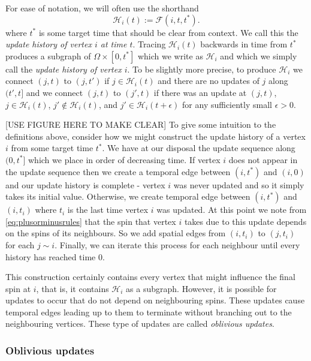 	For ease of notation, we will often use the shorthand
	\begin{equation}
		\mathcal{H}_i(t) := \mathscr{F}(i, t, t^*).
	\end{equation}
	where $t^*$ is some target time that should be clear from context. We call this the \emph{update history of vertex $i$ at time $t$}. Tracing $\mathcal{H}_i(t)$ backwards in time from $t^*$ produces a subgraph of $\Omega \times [0, t^*]$ which we write as $\mathcal{H}_i$ and which we simply call the \emph{update history of vertex $i$}. To be slightly more precise, to produce $\mathcal{H}_i$ we connect $(j,t)$ to $(j,t')$ if $j \in \mathcal{H}_i(t)$ and there are no updates of $j$ along $(t', t]$ and we connect $(j,t)$ to $(j',t)$ if there was an update at $(j, t)$, $j \in \mathcal{H}_i(t)$, $j' \notin \mathcal{H}_i(t)$, and $j' \in \mathcal{H}_i(t+\epsilon)$ for any sufficiently small $\epsilon > 0$.

	

	[USE FIGURE HERE TO MAKE CLEAR]
	To give some intuition to the definitions above, consider how we might construct the update history of a vertex $i$ from some target time $t^*$. We have at our disposal the update sequence along $(0, t^*]$ which we place in order of decreasing time. If vertex $i$ does not appear in the update sequence then we create a temporal edge between $(i, t^*)$ and $(i, 0)$ and our update history is complete - vertex $i$ was never updated and so it simply takes its initial value. Otherwise, we create temporal edge between $(i, t^*)$ and $(i, t_i)$ where $t_i$ is the last time vertex $i$ was updated. At this point we note from \eqref{eq:plusorminusrules} that the spin that vertex $i$ takes due to this update depends on the spins of its neighbours. So we add spatial edges from $(i, t_i)$ to $(j, t_i)$ for each $j\sim i$. Finally, we can iterate this process for each neighbour until every history has reached time $0$.

	This construction certainly contains every vertex that might influence the final spin at $i$, that is, it contains $\mathcal{H}_i$ as a subgraph. However, it is possible for updates to occur that do not depend on neighbouring spins. These updates cause temporal edges leading up to them to terminate without branching out to the neighbouring vertices. These type of updates are called \emph{oblivious updates}.

	\subsubsection{Oblivious updates}

